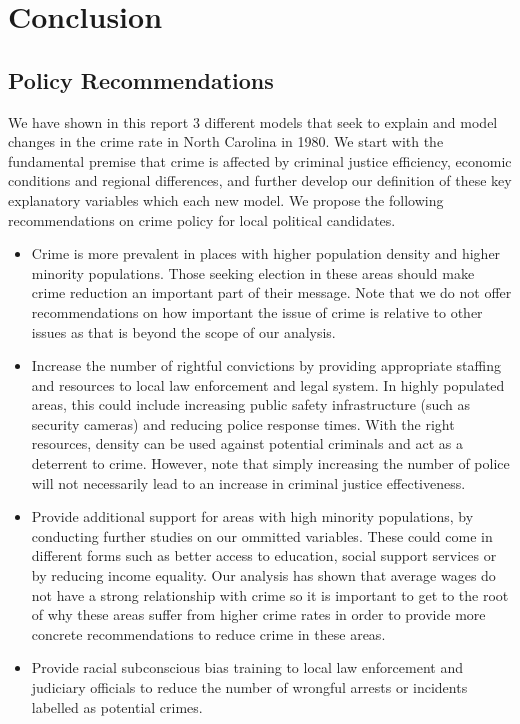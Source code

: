 \documentclass[]{article}
\begin{document}
\hypertarget{conclusion}{%
\section{Conclusion}\label{conclusion}}

\hypertarget{policy-recommendations}{%
\subsection{Policy Recommendations}\label{policy-recommendations}}

We have shown in this report 3 different models that seek to explain and
model changes in the crime rate in North Carolina in 1980. We start with
the fundamental premise that crime is affected by criminal justice
efficiency, economic conditions and regional differences, and further
develop our definition of these key explanatory variables which each new
model. We propose the following recommendations on crime policy for
local political candidates.

\begin{itemize}
  \item Crime is more prevalent in places with higher population density and higher minority populations. Those seeking election in these areas should make crime reduction an important part of their message. Note that we do not offer recommendations on how important the issue of crime is relative to other issues as that is beyond the scope of our analysis.
  \item Increase the number of rightful convictions by providing appropriate staffing and resources to local law enforcement and legal system. In highly populated areas, this could include increasing public safety infrastructure (such as security cameras) and reducing police response times. With the right resources, density can be used against potential criminals and act as a deterrent to crime. However, note that simply increasing the number of police will not necessarily lead to an increase in criminal justice effectiveness.
  \item Provide additional support for areas with high minority populations, by conducting further studies on our ommitted variables. These could come in different forms such as better access to education, social support services or by reducing income equality. Our analysis has shown that average wages do not have a strong relationship with crime so it is important to get to the root of why these areas suffer from higher crime rates in order to provide more concrete recommendations to reduce crime in these areas.
    \item Provide racial subconscious bias training to local law enforcement and judiciary officials to reduce the number of wrongful arrests or incidents labelled as potential crimes.
\end{itemize}
\end{document}
